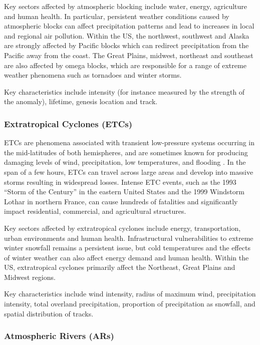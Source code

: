 \documentclass[11pt]{article}
\newcommand\citep{\cite}
\begin{document}
Key sectors affected by atmospheric blocking include water, energy, agriculture and human health.  In particular, persistent weather conditions caused by atmospheric blocks can affect precipitation patterns and lead to increases in local and regional air pollution.  Within the US, the northwest, southwest and Alaska are strongly affected by Pacific blocks which can redirect precipitation from the Pacific away from the coast.  The Great Plains, midwest, northeast and southeast are also affected by omega blocks, which are responsible for a range of extreme weather phenomena such as tornadoes and winter storms.

Key characteristics include intensity (for instance measured by the strength of the anomaly), lifetime, genesis location and track.

\subsubsection*{Extratropical Cyclones (ETCs)}

ETCs are phenomena associated with transient low-pressure systems occurring in the mid-latitudes of both hemispheres, and are sometimes known for producing damaging levels of wind, precipitation, low temperatures, and flooding \citep{serreze1995climatological, ulbrich2009extra}. In the span of a few hours, ETCs can travel across large areas and develop into massive storms resulting in widespread losses. Intense ETC events, such as the 1993 ``Storm of the Century'' in the eastern United States and the 1999 Windstorm Lothar in northern France, can cause hundreds of fatalities and significantly impact residential, commercial, and agricultural structures.

Key sectors affected by extratropical cyclones include energy, transportation, urban environments and human health.  Infrastructural vulnerabilities to extreme winter snowfall remains a persistent issue, but  cold temperatures and the effects of winter weather can also affect energy demand and human health.  Within the US, extratropical cyclones primarily affect the Northeast, Great Plains and Midwest regions.

Key characteristics include wind intensity, radius of maximum wind, precipitation intensity, total overland precipitation, proportion of precipitation as snowfall, and spatial distribution of tracks.

\subsubsection*{Atmospheric Rivers (ARs)}
\end{document}
